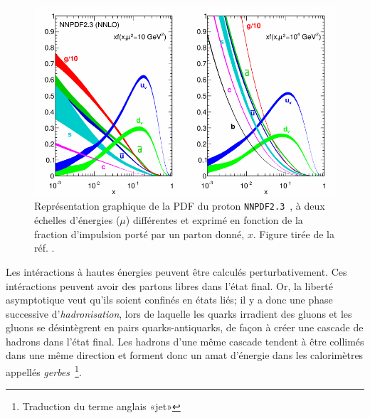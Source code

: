 \begin{figure}
  \centering
  \includegraphics{nnpdf23.pdf}
  \caption{Représentation graphique de la PDF du proton
    \texttt{NNPDF2.3}~\cite{ball_parton_2013}, à deux échelles
    d'énergies ($\mu$) différentes et exprimé en fonction de la
    fraction d'impulsion porté par un parton donné, $x$. Figure tirée de la
    réf. \cite{olive_review_2014}.}
  \label{fig:pdf}
\end{figure}

Les intéractions à hautes énergies peuvent être calculés
perturbativement. Ces intéractions peuvent avoir des partons libres
dans l'état final. Or, la liberté asymptotique veut qu'ils soient
confinés en états liés; il y a donc une phase successive
d'\emph{hadronisation}, lors de laquelle les quarks irradient des
gluons et les gluons se désintègrent en pairs quarks-antiquarks, de
façon à créer une cascade de hadrons dans l'état final. Les hadrons
d'une même cascade tendent à être collimés dans une même direction et
forment donc un amat d'énergie dans les calorimètres appellés
\emph{gerbes}~\footnote{Traduction du terme anglais «jet»}.




